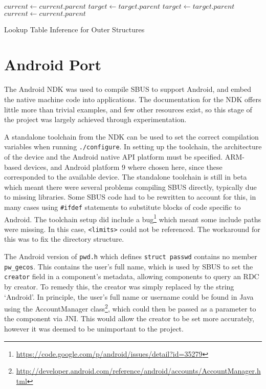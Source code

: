 \documentclass[12pt,twoside,notitlepage]{report}
\begin{document}


\begin{algorithm}
\algnewcommand{}
\begin{algorithmic}
	\State {}
	\State $current\gets current.parent$
	\State $target\gets target.parent$
\EndWhile
{}
	\State {}
	\State $target\gets target.parent$
\EndWhile
{}
	\State {}
	\State $current\gets current.parent$
\EndWhile
\end{algorithmic}
\caption{Lookup Table Inference for Outer Structures}
\label{alg:construct_lookup_outer}
\end{algorithm} 

\section{Android Port}

The Android NDK was used to compile SBUS to support Android, and embed the native machine code into applications. 
The documentation for the NDK offers little more than trivial examples, and few other resources exist, so this stage of the project was largely achieved through experimentation. 

A standalone toolchain from the NDK can be used to set the correct compilation variables when running {\tt ./configure}. 
In setting up the toolchain, the architecture of the device and the Android native API platform must be specified. 
ARM-based devices, and Android platform 9 where chosen here, since these corresponded to the available device. 
The standalone toolchain is still in beta which meant there were several problems compiling SBUS directly, typically due to missing libraries. 
Some SBUS code had to be rewritten to account for this, in many cases using {\tt \#ifdef} statements to substitute blocks of code specific to Android. 
The toolchain setup did include a bug\footnote{\url{https://code.google.com/p/android/issues/detail?id=35279}} which meant some include paths were missing. 
In this case, {\tt <limits>} could not be referenced. 
The workaround for this was to fix the directory structure.

The Android version of {\tt pwd.h} which defines {\tt struct passwd} contains no member {\tt pw\_gecos}. 
This contains the user's full name, which is used by SBUS to set the {\tt creator} field in a component's metadata, allowing components to query an RDC by creator. 
To remedy this, the creator was simply replaced by the string `Android'. 
In principle, the user's full name or username could be found in Java using the AccountManager class\footnote{\url{http://developer.android.com/reference/android/accounts/AccountManager.html}}, which could then be passed as a parameter to the component via JNI. 
This would allow the creator to be set more accurately, however it was deemed to be unimportant to the project. 
\end{document}
